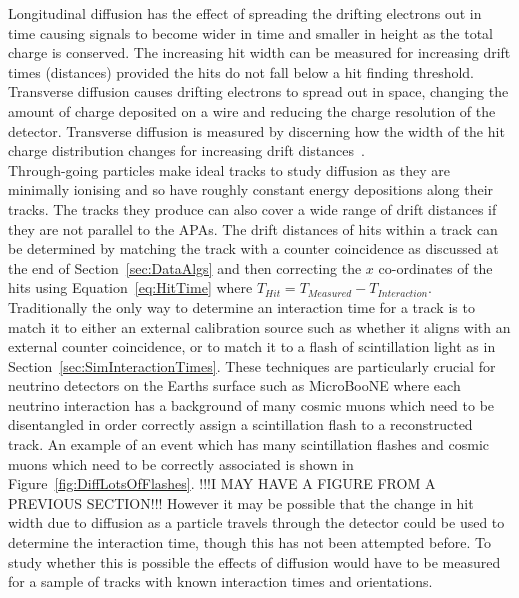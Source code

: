 Longitudinal diffusion has the effect of spreading the drifting electrons out in time causing signals to become wider in time and smaller in height as the total charge is conserved. The increasing hit width can be measured for increasing drift times (distances) provided the hits do not fall below a hit finding threshold. Transverse diffusion causes drifting electrons to spread out in space, changing the amount of charge deposited on a wire and reducing the charge resolution of the detector. Transverse diffusion is measured by discerning how the width of the hit charge distribution changes for increasing drift distances~\citep{DomSeptMeeting}. \\

Through-going particles make ideal tracks to study diffusion as they are minimally ionising and so have roughly constant energy depositions along their tracks. The tracks they produce can also cover a wide range of drift distances if they are not parallel to the APAs. The drift distances of hits within a track can be determined by matching the track with a counter coincidence as discussed at the end of Section~\ref{sec:DataAlgs} and then correcting the $x$ co-ordinates of the hits using Equation~\ref{eq:HitTime} where $T_{Hit} = T_{Measured} - T_{Interaction}$. \\

Traditionally the only way to determine an interaction time for a track is to match it to either an external calibration source such as whether it aligns with an external counter coincidence, or to match it to a flash of scintillation light as in Section~\ref{sec:SimInteractionTimes}. These techniques are particularly crucial for neutrino detectors on the Earths surface such as MicroBooNE where each neutrino interaction has a background of many cosmic muons which need to be disentangled in order correctly assign a scintillation flash to a reconstructed track. An example of an event which has many scintillation flashes and cosmic muons which need to be correctly associated is shown in Figure~\ref{fig:DiffLotsOfFlashes}. !!!I MAY HAVE A FIGURE FROM A PREVIOUS SECTION!!! However it may be possible that the change in hit width due to diffusion as a particle travels through the detector could be used to determine the interaction time, though this has not been attempted before. To study whether this is possible the effects of diffusion would have to be measured for a sample of tracks with known interaction times and orientations. \\


